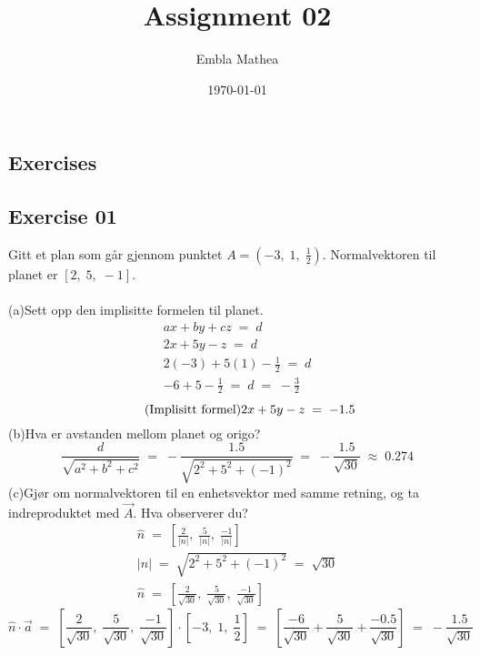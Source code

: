 \documentclass[12pt, a4paper]{article}
\title{Assignment 02}
\author{Embla Mathea}
\date{\today}
\begin{document}
\maketitle

\begin{center}
	\section*{Exercises}
\end{center}

\subsection*{Exercise 01}
Gitt et plan som går gjennom punktet
$A=\left(-3,\;1,\;\frac{1}{2}\right)$.
Normalvektoren til planet er $\left[2,\;5,\;-1\right]$.\\\\		
	(a)\quad Sett opp den implisitte formelen til planet.
			\begin{gather}
				\tag*{}
					ax+by+cz\;=\;d\\
				\tag*{}
					2x+5y-z\;=\;d\\
				\tag*{}
					2(-3)+5(1)-\frac{1}{2}\;=\;d\\
				\tag*{}
					-6+5-\frac{1}{2}\;=\;d\;=\;-\frac{3}{2}
			\end{gather}
			\begin{equation}
				\tag{Implisitt formel}
					2x+5y-z\;=\;-1.5\\
			\end{equation}
	(b)\quad Hva er avstanden mellom planet og origo?
			\begin{equation}
				\tag*{}
					\frac{d}{\sqrt{a^2+b^2+c^2}}\;=\;
					-\frac{1.5}{\sqrt{2^2+5^2+(-1)^2}}\;=\;
					-\frac{1.5}{\sqrt{30}}\;\approx\;0.274					
			\end{equation}
	(c)\quad Gjør om normalvektoren til en enhetsvektor
	med samme retning, og ta indreproduktet med $\vec{A}$.
	Hva observerer du?
			\begin{gather}
				\tag*{}
					\hat{n}\;=\;\left[
						\frac{2}{\left|n\right|},\;
						\frac{5}{\left|n\right|},\;
						\frac{-1}{\left|n\right|}
					\right]\\
				\tag*{}
						\left|n\right|\;=\;\sqrt{2^2+5^2+(-1)^2}
						\;=\;\sqrt{30}\\
				\tag*{}
					\hat{n}\;=\;\left[
						\frac{2}{\sqrt{30}},\;
						\frac{5}{\sqrt{30}},\;
						\frac{-1}{\sqrt{30}}
					\right]
				\end{gather}
			\begin{equation}
				\tag*{}
					\hat{n}\cdot\vec{a}\;=\;
					\left[
						\frac{2}{\sqrt{30}},\;
						\frac{5}{\sqrt{30}},\;
						\frac{-1}{\sqrt{30}}
					\right]\cdot
					\left[
						-3,\;1,\;\frac{1}{2}
					\right]\;=\;
					\left[
						\frac{-6}{\sqrt{30}}+
						\frac{5}{\sqrt{30}}+
						\frac{-0.5}{\sqrt{30}}
					\right]\;=\;-\frac{1.5}{\sqrt{30}}
			\end{equation}
			
\end{document}
